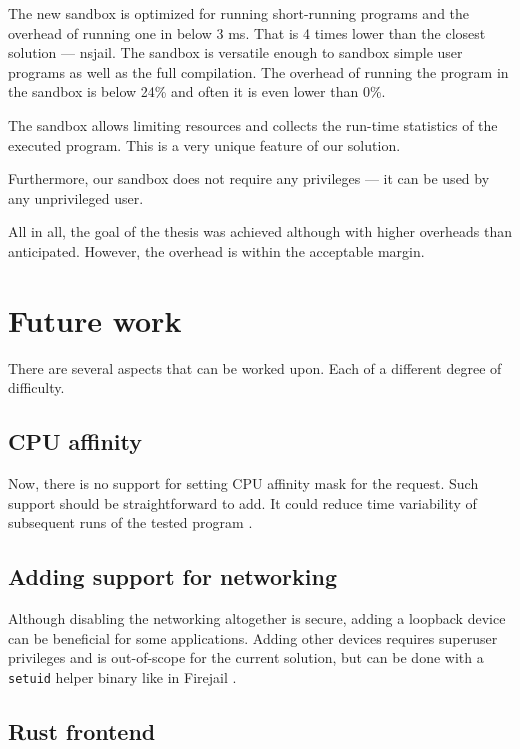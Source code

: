 \documentclass[en]{pracamgr}
\begin{document}
The new sandbox is optimized for running short-running programs and the overhead of running one in below 3 ms. That is 4 times lower than the closest solution --- nsjail. The sandbox is versatile enough to sandbox simple user programs as well as the full compilation. The overhead of running the program in the sandbox is below 24\% and often it is even lower than 0\%.

The sandbox allows limiting resources and collects the run-time statistics of the executed program. This is a very unique feature of our solution.

Furthermore, our sandbox does not require any privileges --- it can be used by any unprivileged user.

All in all, the goal of the thesis was achieved although with higher overheads than anticipated. However, the overhead is within the acceptable margin.

\section{Future work}\label{chapter:future_work}

There are several aspects that can be worked upon. Each of a different degree of difficulty.

\subsection{CPU affinity}

Now, there is no support for setting CPU affinity mask for the request. Such support should be straightforward to add. It could reduce time variability of subsequent runs of the tested program \cite{merry2010performance}.

\subsection{Adding support for networking}

Although disabling the networking altogether is secure, adding a loopback device can be beneficial for some applications. Adding other devices requires superuser privileges and is out-of-scope for the current solution, but can be done with a \texttt{setuid} helper binary like in Firejail \cite{netblue30/firejail}.

\subsection{Rust frontend}
\end{document}
